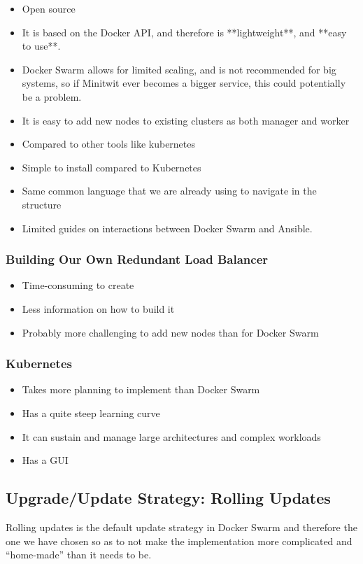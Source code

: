 \cite{ansible:dockerswarm}
\begin{itemize}
    \item Open source
    \item It is based on the Docker API, and therefore is **lightweight**, and **easy to use**.
    \item Docker Swarm allows for limited scaling, and is not recommended for big systems, so if Minitwit ever becomes a bigger service, this could potentially be a problem.
    \item It is easy to add new nodes to existing clusters as both manager and worker
    \item Compared to other tools like kubernetes
    \item Simple to install compared to Kubernetes
    \item Same common language that we are already using to navigate in the structure
    \item Limited guides on interactions between Docker Swarm and Ansible.
\end{itemize}

\subsubsection{Building Our Own Redundant Load Balancer}
\begin{itemize}
    \item Time-consuming to create
    \item Less information on how to build it
    \item Probably more challenging to add new nodes than for Docker Swarm
\end{itemize}

\subsubsection{Kubernetes}
\begin{itemize}
    \item Takes more planning to implement than Docker Swarm
    \item Has a quite steep learning curve
    \item It can sustain and manage large architectures and complex workloads
    \item Has a GUI
\end{itemize}

\subsection{Upgrade/Update Strategy: Rolling Updates}

Rolling updates is the default update strategy in Docker Swarm and therefore the one we have chosen so as to not make the implementation more complicated and “home-made” than it needs to be.
